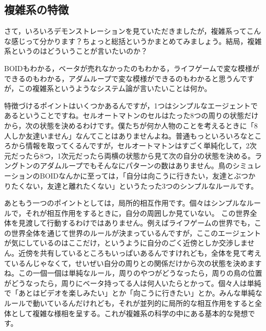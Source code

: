 \documentclass{ltjsbook}
\begin{document}
\subsection{複雑系の特徴}
さて，いろいろデモンストレーションを見ていただきましたが，複雑系ってこんな感じって分かります？ちょっと総括というかまとめてみましょう。結局，複雑系というのはどういうことが言いたいのか？

BOIDもわかる，ベータが売れなかったのもわかる，ライフゲームで変な模様ができるのもわかる，アダムループで変な模様ができるのもわかると思うんですが，この複雑系というようなシステム論が言いたいことは何か。

特徴づけるポイントはいくつかあるんですが，1つはシンプルなエージェントであるということですね。セルオートマトンのセルはたった8つの周りの状態だけから，次の状態を決めるわけです。僕たちが何か人物のことを考えるときに「8人しか友達いません」なんてことはありませんよね。普通もっといろいろなところから情報を取ってくるんですが，セルオートマトンはすごく単純化して，2次元だったら8つ，1次元だったら両横の状態から見て次の自分の状態を決める。ラングトンのアダムループでもそんなにパターンの数はありません。鳥のシミュレーションのBOIDなんかに至っては，「自分は向こうに行きたい，友達とぶつかりたくない，友達と離れたくない」というたった3つのシンプルなルールです。

あともう一つのポイントとしては，局所的相互作用です。個々はシンプルなルールで，それが相互作用をするときに，自分の周囲しか見ていない。
この世界全体を見渡して行動するわけではありません。例えばライフゲームの世界でも，この世界全体を通じて世界のルールが決まっているんですが，ここのエージェントが気にしているのはここだけ，というように自分のごく近傍としか交渉しません。近傍を共有しているところもいっぱいあるんですけれども，全体を見て考えているんじゃなくて，せいぜい自分の周りとの関係だけから次の状態を決めますね。この一個一個は単純なルール，周りのやつがどうなったら，周りの鳥の位置がどうなったら，周りにベータ持ってる人は何人いたらとかって。個々人は単純で「あとはビデオを楽しみたい」とか「向こうに行きたい」とか。みんな単純なルールで動いているんだけれども，それが並列的に局所的な相互作用をすると全体として複雑な様相を呈する。これが複雑系の科学の中にある基本的な発想です。
\end{document}
